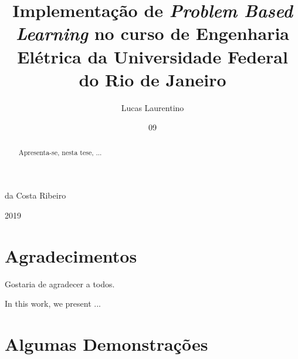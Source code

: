 \documentclass[grad,numbers]{coppe}
\begin{document}
    \title{Implementação de \textit{Problem Based Learning} no curso de Engenharia Elétrica da Universidade Federal do Rio de Janeiro}
    \author{Lucas Laurentino}{da Costa Ribeiro}
    
    
    
    \date{09}{2019}
    
    
    \maketitle
    
    \frontmatter

\dedication{Ao meu avô, \\Luiz Laurentino da Costa}

\chapter*{Agradecimentos}

  Gostaria de agradecer a todos.

\begin{abstract}

  Apresenta-se, nesta tese, ...

\end{abstract}

\begin{foreignabstract}

In this work, we present ...

\end{foreignabstract}

\tableofcontents
\listoffigures
\listoftables
\printlosymbols
\printloabbreviations


\mainmatter

 


  


  
  


\backmatter



\appendix
\chapter{Algumas Demonstrações}
  	
\end{document}
